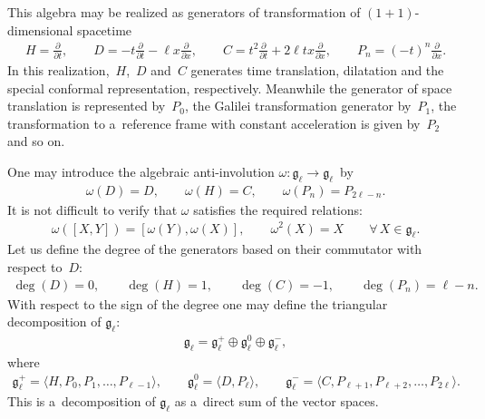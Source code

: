 \documentclass[11pt]{article}
\numberwithin{equation}{section}
\begin{document}
This algebra may be realized as generators of transformation of $(1+1)$-dimensional spacetime
\begin{gather*}
H = \frac{\partial}{\partial t},
\qquad
D =-t\frac{\partial}{\partial t} -\ell x \frac{\partial}{\partial x},
\qquad
C = t^2 \frac{\partial}{\partial t} + 2 \ell tx \frac{\partial}{\partial x},
\qquad
P_n = (-t)^n \frac{\partial}{\partial x}.
\end{gather*}
In this realization,~$H$,~$D$ and~$C$ generates time translation, dilatation and the special conformal representation,
respectively.
Meanwhile the generator of space translation is represented by~$P_0$, the Galilei transformation generator by~$P_1$,
the transformation to a~reference frame with constant acceleration is given by~$P_2$ and so on.

One may introduce the algebraic anti-involution $ \omega: {\mathfrak g}_{\ell} \to {\mathfrak g}_{\ell} $~by
\begin{gather*}
\omega(D) = D, \qquad \omega(H) = C, \qquad \omega(P_n) = P_{2\ell-n}.
\end{gather*}
It is not dif\/f\/icult to verify that $ \omega $ satisf\/ies the required relations:
\begin{gather*}
\omega([X,Y]) = [\omega(Y), \omega(X)], \qquad \omega^2(X) = X \qquad  \forall\, X \in {\mathfrak g}_{\ell}.
\end{gather*}
Let us def\/ine the degree of the generators based on their commutator with respect to~$D$:
\begin{gather*}
\deg(D) = 0, \qquad \deg(H) = 1, \qquad \deg(C) = -1, \qquad \deg(P_n) = \ell-n.
\end{gather*}
With respect to the sign of the degree one may def\/ine the triangular decomposition of ${\mathfrak g}_{\ell}$:
\begin{gather*}
    {\mathfrak g}_{\ell} = {\mathfrak g}_{\ell}^+ \oplus {\mathfrak g}_{\ell}^0 \oplus {\mathfrak g}_{\ell}^-,
\end{gather*}
where
\begin{gather*}
{\mathfrak g}_{\ell}^+ = \langle H, P_0, P_1, \dots, P_{\ell-1} \rangle,
\qquad
{\mathfrak g}_{\ell}^0 = \langle D, P_{\ell} \rangle,
\qquad
{\mathfrak g}_{\ell}^- = \langle C, P_{\ell+1}, P_{\ell+2}, \dots, P_{2\ell} \rangle.
\end{gather*}
This is a~decomposition of $ {\mathfrak g}_{\ell} $ as a~direct sum of the vector spaces.
\end{document}
